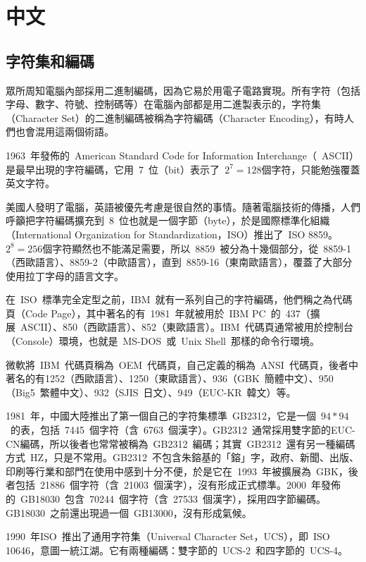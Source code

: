 \chapter{中文}

\section{字符集和編碼}
\label{sec:encoding}

眾所周知電腦內部採用二進制編碼，因為它易於用電子電路實現。所有字符（包括字母、數字、符號、控制碼等）在電腦內部都是用二進製表示的，字符集（Character Set）的二進制編碼被稱為字符編碼（Character Encoding），有時人們也會混用這兩個術語。

1963~年發佈的~American Standard Code for Information Interchange（~ASCII）是最早出現的字符編碼，它用~7~位（bit）表示了~$2^7=128$個字符，只能勉強覆蓋英文字符。

美國人發明了電腦，英語被優先考慮是很自然的事情。隨著電腦技術的傳播，人們呼籲把字符編碼擴充到~8~位也就是一個字節（byte），於是國際標準化組織（International Organization for Standardization，ISO）推出了~ISO 8859。$2^8=256$個字符顯然也不能滿足需要，所以~8859~被分為十幾個部分，從~8859-1（西歐語言）、8859-2（中歐語言），直到~8859-16（東南歐語言），覆蓋了大部分使用拉丁字母的語言文字。

在~ISO~標準完全定型之前，IBM~就有一系列自己的字符編碼，他們稱之為代碼頁（Code Page），其中著名的有~1981~年就被用於~IBM PC~的~437（擴展~ASCII）、850（西歐語言）、852（東歐語言）。IBM~代碼頁通常被用於控制台（Console）環境，也就是~MS-DOS~或~Unix Shell~那樣的命令行環境。

微軟將~IBM~代碼頁稱為~OEM~代碼頁，自己定義的稱為~ANSI~代碼頁，後者中著名的有1252（西歐語言）、1250（東歐語言）、936（GBK~簡體中文）、950（Big5~繁體中文）、932（SJIS~日文）、949（EUC-KR~韓文）等。

1981~年，中國大陸推出了第一個自己的字符集標準~GB2312，它是一個~$94*94$~的表，包括~7445~個字符（含~6763~個漢字）。GB2312~通常採用雙字節的EUC-CN編碼，所以後者也常常被稱為~GB2312~編碼；其實~GB2312~還有另一種編碼方式~HZ，只是不常用。GB2312~不包含朱鎔基的「鎔」字，政府、新聞、出版、印刷等行業和部門在使用中感到十分不便，於是它在~1993~年被擴展為~GBK，後者包括~21886~個字符（含~21003~個漢字），沒有形成正式標準。2000~年發佈的~GB18030~包含~70244~個字符（含~27533~個漢字），採用四字節編碼。GB18030~之前還出現過一個~GB13000，沒有形成氣候。

1990~年ISO~推出了通用字符集（Universal Character Set，UCS），即~ISO 10646，意圖一統江湖。它有兩種編碼：雙字節的~UCS-2~和四字節的~UCS-4。

